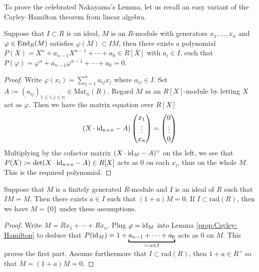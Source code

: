 To prove the celebrated Nakayama's Lemma, let us recall an easy variant of the Cayley--Hamilton theorem from linear algebra.
\begin{lemma}\label{prop:Cayley-Hamilton}
	Suppose that $I \subset R$ is an ideal, $M$ is an $R$-module with generators $x_1, \ldots, x_n$ and $\varphi \in \operatorname{End}_R(M)$ satisfies $\varphi(M) \subset IM$, then there exists a polynomial $P(X) = X^n + a_{n-1} X^{n-1} + \cdots + a_0 \in R[X]$ with $a_i \in I$, such that $P(\varphi) = \varphi^n + a_{n-1} \varphi^{n-1} + \cdots + a_0 = 0$.
\end{lemma}
\begin{proof}
	Write $\varphi(x_i) = \sum_{j=1}^n a_{ij} x_j$ where $a_{ij} \in I$. Set $A := (a_{ij})_{1 \leq i,j \leq n} \in \text{Mat}_n(R)$. Regard $M$ as an $R[X]$-module by letting $X$ act as $\varphi$. Then we have the matrix equation over $R[X]$
	\[ (X \cdot \mathrm{id}_{n \times n} - A) \begin{pmatrix} x_1 \\ \vdots \\ x_n \end{pmatrix} = \begin{pmatrix} 0 \\ \vdots \\ 0 \end{pmatrix} \]
	Multiplying by the cofactor matrix $(X \cdot \mathrm{id}_M - A)^\vee$ on the left, we see that $P(X) := \det(X \cdot \mathrm{id}_{n \times n} - A) \in R[X]$ acts as $0$ on each $x_i$, thus on the whole $M$. This is the required polynomial.
\end{proof}

\begin{theorem}\label{prop:NAK}
	Suppose that $M$ is a finitely generated $R$-module and $I$ is an ideal of $R$ such that $IM = M$. Then there exists $a \in I$ such that $(1+a)M=0$. If $I \subset \text{rad}(R)$, then we have $M = \{0\}$ under these assumptions.
\end{theorem}
\begin{proof}
	Write $M = Rx_1 + \cdots + Rx_n$. Plug $\varphi = \mathrm{id}_M$ into Lemma \ref{prop:Cayley-Hamilton} to deduce that $P(\identity_M) = 1 + \underbracket{a_{n-1} + \cdots + a_0}_{=: a \in I}$ acts as $0$ on $M$. This proves the first part. Assume furthermore that $I \subset \text{rad}(R)$, then $1+a \in R^\times$ so that $M = (1+a)M = 0$.
\end{proof}

